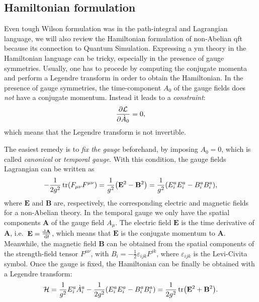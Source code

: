 \subsection{Hamiltonian formulation}
\label{sub:hamiltonian_formulation}

Even tough Wilson formulation \cite{wilson1974confinement} was in the path-integral and Lagrangian language, we will also review the Hamiltonian formulation of non-Abelian \ac{qft} because its connection to Quantum Simulation.
Expressing a \ac{ym} theory in the Hamiltonian language can be tricky, especially in the presence of gauge symmetries.
Usually, one has to procede by computing the conjugate momenta and perform a Legendre transform in order to obtain the Hamiltonian.
In the presence of gauge symmetries, the time-component $A_0$ of the gauge fields does \emph{not} have a conjugate momentum.
Instead it leads to a \emph{constraint}:
\begin{equation}
    \pdv{\mathcal{L}}{\dot{A}_0} = 0,
\end{equation}
which means that the Legendre transform is not invertible.

The easiest remedy is to \emph{fix the gauge} beforehand, by imposing $A_0 = 0$, which is called \emph{canonical} or \emph{temporal gauge}.
With this condition, the gauge fields Lagrangian can be written as
\begin{equation}
    - \frac{1}{2 g^2} \tr(F_{\mu \nu} F^{\mu \nu})
    = \frac{1}{g^2} \qty( \mathbf{E}^2 - \mathbf{B}^2 )
    = \frac{1}{g^2} \qty(E^a_i E^a_i - B^a_i B^a_i),
    \label{eq:YM_lagrang_temporal_gauge}
\end{equation}
where $\mathbf{E}$ and $\mathbf{B}$ are, respectively, the corresponding electric and magnetic fields for a non-Abelian theory.
In the temporal gauge we only have the spatial components $\mathbf{A}$ of the gauge field $A_{\mu}$.
The electric field $\mathbf{E}$ is the time derivative of $\mathbf{A}$, i.e.~$\mathbf{E} = \dv{\mathbf{A}}{t}$,
which means that $\mathbf{E}$ is the conjugate momentum to $\mathbf{A}$.
Meanwhile, the magnetic field $\mathbf{B}$ can be obtained from the spatial components of the strength-field tensor $F^{\mu \nu}$, with $B_i = - \frac{1}{2} \varepsilon_{ijk} F^{jk}$, where $\varepsilon_{ijk}$ is the Levi-Civita symbol.
Once the gauge is fixed, the Hamiltonian can be finally be obtained with a Legendre transform:
\begin{equation}
    \mathcal{H}
    = \frac{1}{g^2} E^a_i \dot{A}^a_i - \frac{1}{2 g^2} \qty( E^a_i E^a_i - B^a_i B^a_i )
    = \frac{1}{2g^2} \tr ( \mathbf{E}^2 + \mathbf{B}^2 ).
\end{equation}

